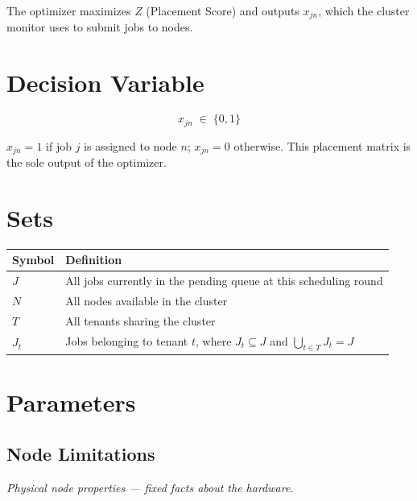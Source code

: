 \documentclass[11pt]{article}
\begin{document}
\medskip
The optimizer maximizes $Z$ (Placement Score) and outputs $x_{jn}$, which
the cluster monitor uses to submit jobs to nodes.

\section{Decision Variable}

\[
  x_{jn} \;\in\; \{0,1\}
\]

$x_{jn} = 1$ if job $j$ is assigned to node $n$; $x_{jn} = 0$ otherwise.
This placement matrix is the sole output of the optimizer.

\section{Sets}

\begin{center}
\begin{tabular}{@{}l p{10.5cm}@{}}
\toprule
Symbol & Definition \\
\midrule
$J$   & All jobs currently in the pending queue at this scheduling round \\[3pt]
$N$   & All nodes available in the cluster \\[3pt]
$T$   & All tenants sharing the cluster \\[3pt]
$J_t$ & Jobs belonging to tenant $t$, where $J_t \subseteq J$ and
        $\displaystyle\bigcup_{t \in T} J_t = J$ \\
\bottomrule
\end{tabular}
\end{center}

\section{Parameters}

\subsection*{Node Limitations}
\textit{Physical node properties --- fixed facts about the hardware.}
\end{document}
